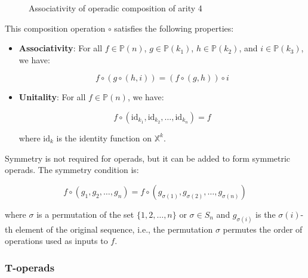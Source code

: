 \begin{figure}[h]
\caption{Associativity of operadic composition of arity 4}
\label{fig:arity-4-associativity}
\end{figure}

This composition operation $\circ$ satisfies the following properties:

\begin{itemize}
  \item \textbf{Associativity}: For all $f \in \mathbb{P}(n)$, $g \in \mathbb{P}(k_1)$, $h \in \mathbb{P}(k_2)$, and $i \in \mathbb{P}(k_3)$, we have:

  \begin{equation}
    f \circ (g \circ (h, i)) = (f \circ (g, h)) \circ i
  \end{equation}

  \item \textbf{Unitality}: For all $f \in \mathbb{P}(n)$, we have:

  \begin{equation}
    f \circ (\text{id}_{k_1}, \text{id}_{k_2}, \ldots, \text{id}_{k_n}) = f
  \end{equation}

  where $\text{id}_k$ is the identity function on $\mathbb{X}^k$.
\end{itemize}

Symmetry is not required for operads, but it can be added to form symmetric operads. The symmetry condition is:

\begin{equation}
  f \circ (g_1, g_2, \ldots, g_n) = f \circ (g_{\sigma(1)}, g_{\sigma(2)}, \ldots, g_{\sigma(n)})
\end{equation}

where $\sigma$ is a permutation of the set $\{1, 2, \ldots, n\}$ or $\sigma \in S_n$ and $g_{\sigma(i)}$ is the $\sigma(i)$-th element of the original sequence, i.e., the permutation $\sigma$ permutes the order of operations used as inputs to $f$.

\subsubsection{T-operads}

